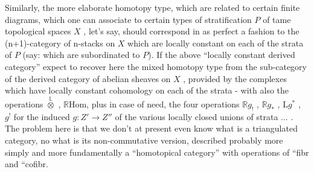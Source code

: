 Similarly, the more elaborate homotopy type, which are related to certain
finite diagrams, which one can associate to certain types of stratification
$P$ of tame topological spaces $X$ , let's say, should correspond in as perfect
a fashion to the (n+1)-category of n-stacks on $X$ which are locally constant
on each of the strata of $P$ (say: which are subordinated to $P$). If the
above  ``locally constant derived category''  
 expect to recover here the mixed homotopy type from the  sub-category of the
derived category of abelian sheaves on $X$ , provided by the complexes which
have locally constant cohomology on each of the strata - with also the
operations $\overset{\mathbb{L}}{\otimes}$ , $\mathbb{R}\mathrm{Hom}$, plus in case of need, the four operations
$\mathbb{R}g_!$ , $\mathbb{R}g_*$ , $\mathrm{L}g^*$ , $g^!$ for the induced $g : Z' \to Z''$ of the various locally
closed unions of strata ... . The problem here is that we don't at present
even know what is a triangulated category, no  what is its non-commutative
version, described probably more simply and more fundamentally\unsure{\over{;}{:}}  a
``homotopical category'' with operations of  ``fibr and ``cofibr.

